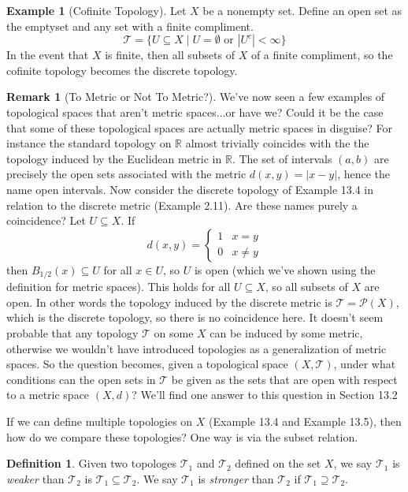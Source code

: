 \documentclass{article}
\newcommand{\R}{\mathbb{R}}
\newcommand{\T}{\mathcal{T}}
\theoremstyle{definition}
\newtheorem{definition}{Definition}[section]
\newtheorem{example}{Example}[section]
\newtheorem{remark}{Remark}[section]
\begin{document}
	\begin{example}[Cofinite Topology]
		Let $X$ be a nonempty set. Define an open set as the emptyset and any set with a finite compliment. 
		$$ \T = \{U\subseteq X\mid U = \emptyset\text{ or }|U^c|<\infty\}$$
		In the event that $X$ is finite, then all subsets of $X$ of a finite compliment, so the cofinite topology becomes the discrete topology.  
	\end{example}

	\begin{remark}[To Metric or Not To Metric?]
		We've now seen a few examples of topological spaces that aren't metric spaces...or have we? Could it be the case that some of these topological spaces are actually metric spaces in disguise? For instance the standard topology on $\R$ almost trivially coincides with the the topology induced by the Euclidean metric in $\R$. The set of intervals $(a,b)$ are precisely the open sets associated with the metric $d(x,y)=|x-y|$, hence the name open intervals. Now consider the discrete topology of Example 13.4 in relation to the discrete metric (Example 2.11). Are these names purely a coincidence? Let $U\subseteq X$. If
		$$d(x,y)=\begin{cases}
			1 & x=y\\
			0 & x\neq y
		\end{cases} $$
		then $B_{1/2}(x)\subseteq U$ for all $x\in U$, so $U$ is open (which we've shown using the definition for metric spaces). This holds for all $U\subseteq X$, so all subsets of $X$ are open. In other words the topology induced by the discrete metric is $\T=\mathcal P(X)$, which is the discrete topology, so there is no coincidence here. It doesn't seem probable that any topology $\T$ on some $X$ can be induced by some metric, otherwise we wouldn't have introduced topologies as a generalization of metric spaces. So the question becomes, given a topological space $(X,\T)$, under what conditions can the open sets in $\T$ be given as the sets that are open with respect to a metric space $(X,d)$? We'll find one answer to this question in Section 13.2
	\end{remark}

	If we can define multiple topologies on $X$ (Example 13.4 and Example 13.5), then how do we compare these topologies? One way is via the subset relation.
	
	
	\begin{definition}
		Given two topologes $\T_1$ and $\T_2$ defined on the set $X$, we say $\T_1$ is 
		\textit{\color{red}weaker} than $\T_2$ is $\T_1 \subseteq \T_2$. We say $\T_1$ is  
		\textit{\color{red}stronger} than $\T_2$ if $\T_1 \supseteq \T_2$.
	\end{definition}
\end{document}
